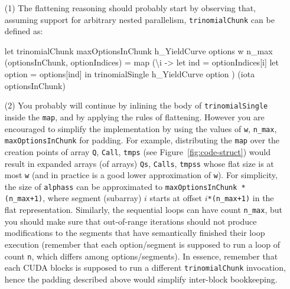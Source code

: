 \documentclass[a4paper,11pt]{article}
\begin{document}
\begin{itemize}
    \item[(1)] The flattening reasoning should probably start by observing
                that, assuming support for arbitrary nested parallelism,
                {\tt trinomialChunk} can be defined as:
\begin{fancycode}
let trinomialChunk maxOptionsInChunk h_YieldCurve options
                   w n_max (optionsInChunk, optionIndices) =
    map (\textbackslash{}i -> 
                 let ind    = optionIndices[i]
                 let option = options[ind]
                 in  trinomialSingle h_YieldCurve option
         ) (iota optionsInChunk)
\end{fancycode}

    \item[(2)] You probably will continue by inlining the body
        of {\tt trinomialSingle} inside the {\tt map}, and by
        applying the rules of flattening. However you are encouraged
        to simplify the implementation by using the values of
        {\tt w}, {\tt n\_max}, {\tt maxOptionsInChunk} for padding.
        For example, distributing the {\tt map} over the creation
        points of array {\tt Q}, {\tt Call}, {\tt tmps} 
        (see Figure~\ref{fig:code-struct})
        would result in expanded arrays (of arrays) {\tt Qs},
        {\tt Calls}, {\tt tmpss} whose flat size is at most {\tt w}
        (and in practice is a good lower approximation of {\tt w}).
        For simplicity, the size of {\tt alphass} can be approximated
        to {\tt maxOptionsInChunk * (n\_max+1)}, where 
        segment (subarray) $i$ starts at offset {\tt $i$*(n\_max+1)}
        in the flat representation.   Similarly, the sequential
        loops can have count {\tt n\_max}, but you should make sure 
        that out-of-range iterations should not produce modifications
        to the segments that have semantically finished
        their loop execution (remember that each option/segment is supposed
        to run a loop of count {\tt n}, which differs among options/segments).
        In essence, remember that each CUDA blocks is supposed to
        run a different {\tt trinomialChunk} invocation, hence
        the padding described above would simplify inter-block 
        bookkeeping.


\end{itemize}
\end{document}
